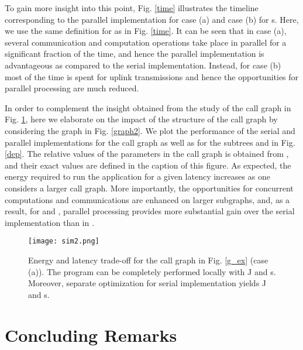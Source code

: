 \documentclass[journal,twocolumn,10pt,twoside]{IEEEtranTCOM}
\theoremstyle{plain}
\theoremstyle{plain}
\theoremstyle{remark}
\begin{document}
To gain more insight into this point, Fig. \ref{time} illustrates the timeline corresponding to the parallel implementation for case (a) and case (b) for  s. Here, we use the same definition for  as in Fig. \ref{time}. It can be seen that in case (a), several communication and computation operations take place in parallel for a significant  fraction of the time, and hence the parallel implementation is advantageous as compared to the serial implementation. Instead, for case (b) most of the time is spent for uplink transmissions and hence the opportunities for parallel processing are much reduced.

In order to complement the insight obtained from the study of the call graph in Fig. \ref{res1}, here we elaborate on the impact of the structure of the call graph by considering the graph in Fig. \ref{graph2}. We plot the performance of the serial and parallel implementations for the call graph  as well as for the subtrees  and  in Fig. \ref{dep}. The relative values of the parameters in the call graph  is obtained from \cite{hermp}, and their exact values are defined in the caption of this figure. As expected, the energy required to run the application for a given latency increases as one considers a larger call graph. More importantly, the opportunities for concurrent computations and communications are enhanced on larger subgraphs, and, as a result, for  and , parallel processing provides more substantial gain over the serial implementation than in .


\begin{figure}
\centering
\texttt{[image: sim2.png]}
\caption{Energy and latency trade-off for the call graph  in Fig. \ref{g_ex} (case (a)). The program can be completely performed locally with  J and  s. Moreover, separate optimization for serial implementation yields   J and  s.}\label{res1}
\end{figure}








\section{Concluding Remarks}
\end{document}
